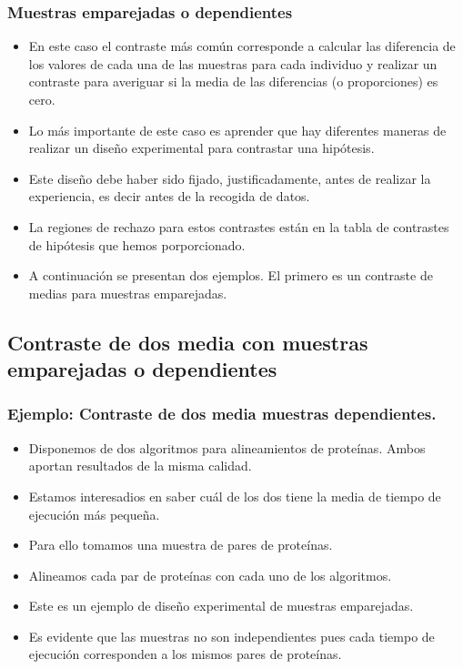 \begin{frame}
\frametitle{Muestras emparejadas o dependientes}
\begin{itemize}
\item En este caso el contraste  más común corresponde a calcular las diferencia de  los valores de  cada una de las muestras para cada individuo y realizar un contraste para averiguar si la media de las diferencias (o proporciones) es cero.
\item Lo más importante de este caso es aprender que hay diferentes maneras de realizar un diseño experimental para contrastar una hipótesis.
\item  Este diseño debe haber sido fijado, justificadamente, antes de realizar la experiencia, es decir antes de  la recogida de datos.
\item La regiones de rechazo para estos contrastes están en la tabla de contrastes de hipótesis que hemos porporcionado.
\item  A continuación se presentan dos ejemplos. El primero es un contraste de medias para muestras emparejadas.
\end{itemize}
\end{frame}
\subsection{Contraste de dos media con muestras emparejadas o dependientes}
\begin{frame}
\frametitle{Ejemplo: Contraste de dos media muestras dependientes.}
\begin{itemize}
\item Disponemos de dos algoritmos para alineamientos de proteínas. Ambos aportan resultados de la misma calidad.
\item Estamos interesadios en saber cuál de los dos tiene la  media de tiempo de ejecución más pequeña.
\item Para ello tomamos una muestra de pares de proteínas.
\item Alineamos cada par de proteínas con cada uno de los algoritmos.
\item Este es un ejemplo de diseño experimental de muestras emparejadas.
\item  Es evidente que las muestras no son independientes pues cada tiempo de ejecución corresponden a los mismos pares de proteínas.
\end{itemize}
\end{frame}


